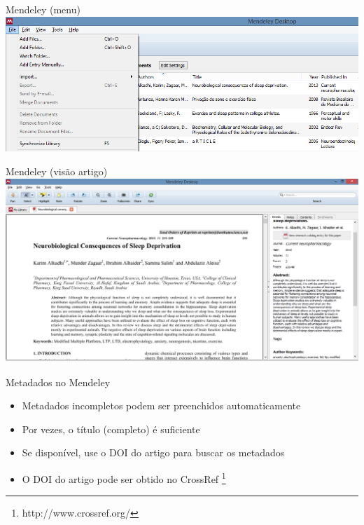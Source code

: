 \documentclass{beamer}
\begin{document}
\begin{frame}{Mendeley (menu)}
  \centering
  \includegraphics[width=1.2\textwidth]{Referencias/mendeley-menu}
\end{frame}

\begin{frame}{Mendeley (visão artigo)}
  \centering
  \includegraphics[width=1.2\textwidth]{Referencias/mendeley-artigo}
\end{frame}

\begin{frame}{Metadados no Mendeley}
  \begin{itemize}
    \footnotesize
  \item Metadados incompletos podem ser preenchidos automaticamente
  \item Por vezes, o título (completo) é suficiente
  \item Se disponível, use o DOI do artigo para buscar os metadados
  \item O DOI do artigo pode ser obtido no CrossRef
    \footnote{http://www.crossref.org/}
  \end{itemize}
\end{frame}
\end{document}
